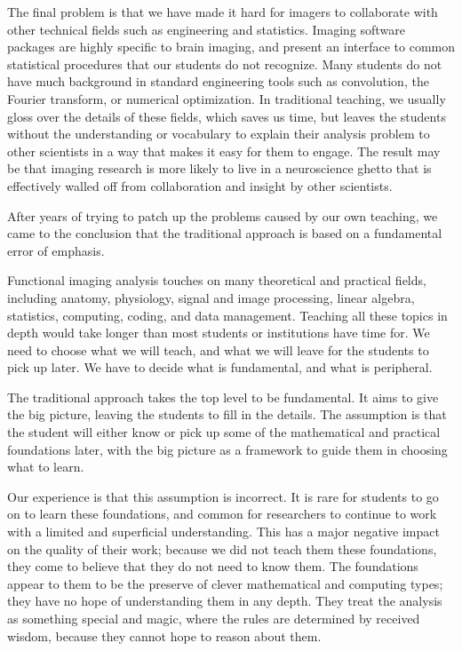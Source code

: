 The final problem is that we have made it hard for imagers to collaborate with
other technical fields such as engineering and statistics.  Imaging software
packages are highly specific to brain imaging, and present an interface to
common statistical procedures that our students do not recognize.  Many
students do not have much background in standard engineering tools such as
convolution, the Fourier transform, or numerical optimization.  In traditional
teaching, we usually gloss over the details of these fields, which saves us
time, but leaves the students without the understanding or vocabulary to
explain their analysis problem to other scientists in a way that makes it easy
for them to engage.  The result may be that imaging research is more likely to
live in a neuroscience ghetto that is effectively walled off from
collaboration and insight by other scientists.

After years of trying to patch up the problems caused by our own teaching, we
came to the conclusion that the traditional approach is based on a fundamental
error of emphasis.

Functional imaging analysis touches on many theoretical and practical fields,
including anatomy, physiology, signal and image processing, linear algebra,
statistics, computing, coding, and data management.  Teaching all these topics
in depth would take longer than most students or institutions have time for.
We need to choose what we will teach, and what we will leave for the students
to pick up later. We have to decide what is fundamental, and what is
peripheral.

The traditional approach takes the top level to be fundamental.  It aims to
give the big picture, leaving the students to fill in the details. The
assumption is that the student will either know or pick up some of the
mathematical and practical foundations later, with the big picture as a
framework to guide them in choosing what to learn.

Our experience is that this assumption is incorrect.  It is rare for
students to go on to learn these foundations, and common for researchers to
continue to work with a limited and superficial understanding.  This has a
major negative impact on the quality of their work; because we did not teach
them these foundations, they come to believe that they do not need to know
them.  The foundations appear to them to be the preserve of clever
mathematical and computing types; they have no hope of understanding them in
any depth.  They treat the analysis as something special and magic, where the
rules are determined by received wisdom, because they cannot hope to reason
about them.

